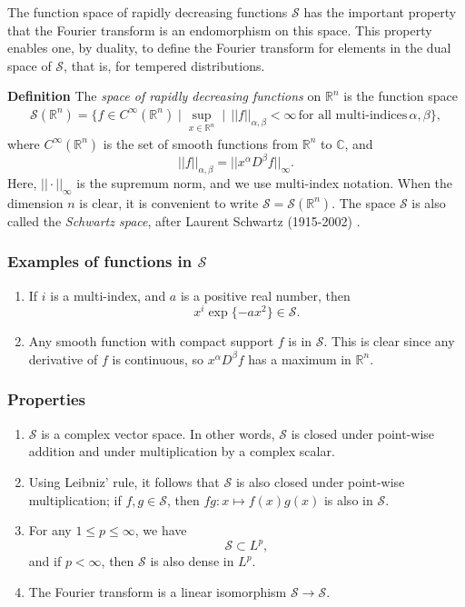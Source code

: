 \documentclass[12pt]{article}
\newcommand{\sR}[0]{\mathbb{R}}
\newcommand{\sC}[0]{\mathbb{C}}
\begin{document}
\newcommand{\cD}[0]{\mathcal{D}}
 \newcommand{\scomp}[0]{C^\infty_0}
 \newcommand{\cS}[0]{\mathcal{S}}

The function space of rapidly decreasing functions $\cS$ has the
important property that the Fourier transform is an endomorphism
on this space. This property enables one, by duality, to 
define the Fourier transform
for elements in the dual space of $\cS$, that is, for tempered 
distributions. 

{\bf Definition}  
The \emph{space of rapidly decreasing functions} on $\sR^n$
is the function space
\begin{eqnarray*}
\cS(\sR^n)=\{ f \in C^\infty(\sR^n) \mid \sup_{x\in \sR^n} \mid \, ||f||_{\alpha,\beta} <
 \infty\, \mbox{for all multi-indices}  \, \alpha, \beta \},
\end{eqnarray*}
where $C^\infty(\sR^n)$ is the set of smooth functions 
from $\sR^n$ to $\sC$, and 
$$||f||_{\alpha,\beta}=||x^\alpha D^\beta f||_\infty.$$
Here, $||\cdot||_\infty$ is the supremum norm, and we use 
multi-index notation.
When the dimension $n$ is clear, it is convenient to write 
$\cS=\cS(\sR^n)$. The space $\cS$ is also called the 
\emph{Schwartz space}, after Laurent Schwartz
(1915-2002) \cite{schwartz_bib}.


\subsubsection{Examples of functions in $\cS$} 
\begin{enumerate}
\item If $i$ is a multi-index, and $a$ is a positive
real number, then
$$ x^i \exp\{-a x^2\} \in \cS.$$
\item Any smooth function with compact support $f$ is in $\cS$.
This is clear since any derivative of $f$ is continuous, so
$x^\alpha D^\beta f$ has a maximum in $\sR^n$. 
\end{enumerate}

\subsubsection{Properties}
\begin{enumerate}
\item 
$\cS$ is a complex vector space. In other words, 
$\cS$ is closed under point-wise addition and under 
multiplication by a complex scalar. 
\item Using Leibniz' rule, it follows that $\cS$ is also closed
under point-wise multiplication; if $f,g\in \cS$, then
$fg: x\mapsto f(x)g(x)$ is also in $\cS$.
\item For any $1\le p\le \infty$, we have \cite{reed}
$$ \cS\subset L^p,$$
and if $p<\infty$, then $\cS$ is also dense in $L^p$. 
\item The Fourier transform is a linear isomorphism $\cS\to\cS$. 
\end{enumerate}
\end{document}
